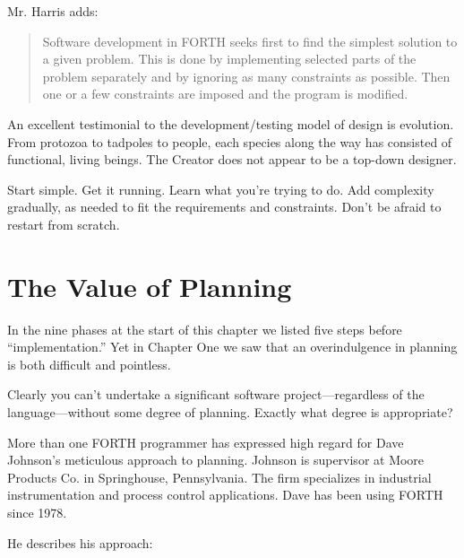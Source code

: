 
\noindent Mr. Harris adds:

\begin{quotation}
\noindent Software development in FORTH seeks first to find the simplest solution
to a given problem. This is done by implementing selected parts of the
problem separately and by ignoring as many constraints as possible. Then one
or a few constraints are imposed and the program is modified.
\end{quotation}

\noindent An excellent testimonial to the development/testing model of design is
evolution. From protozoa to tadpoles to people, each species along the
way has consisted of functional, living beings. The Creator does not
appear to be a top-down designer.

\begin{tip}
Start simple. Get it running. Learn what you're trying to do. Add
complexity gradually, as needed to fit the requirements and constraints. Don't be
afraid to restart from scratch.
\end{tip}

\section{The Value of Planning}

\noindent In the nine phases at the start of this chapter we listed five steps before
``implementation.'' Yet in Chapter One we saw that an overindulgence in
planning is both difficult and pointless.

Clearly you can't undertake a significant software
project---regardless of the language---without some degree of planning.
Exactly what degree is appropriate?

\blackline{2ex}
More than one FORTH programmer has expressed high regard for Dave
Johnson's meticulous approach to planning. Johnson is supervisor at
Moore Products Co. in Springhouse, Pennsylvania. The firm specializes
in industrial instrumentation and process control applications. Dave has
been using FORTH since 1978.

He describes his approach:

